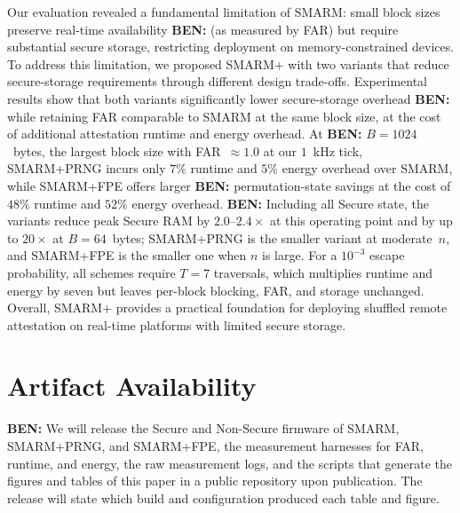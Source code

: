 \documentclass{ieeeaccess}
\DeclareRobustCommand{\ben}[1]{{\color{BENcolor}\textbf{BEN:} #1}}
\newcommand{\rtsmarm}{SMARM+\xspace}
\newcommand{\rtsmarmone}{SMARM+PRNG\xspace}
\newcommand{\rtsmarmtwo}{SMARM+FPE\xspace}
\begin{document}
Our evaluation revealed a fundamental limitation of SMARM: small block sizes preserve real-time availability \ben{(as measured by FAR)} but require substantial secure storage, restricting deployment on memory-constrained devices. To address 
this limitation, we proposed \rtsmarm with two variants that reduce secure-storage requirements through different design trade-offs. Experimental results show that both variants significantly lower secure-storage overhead \ben{while retaining FAR comparable to SMARM at the same block size}, at 
the cost of additional attestation runtime and energy overhead. At \ben{$B = 1024$~bytes, the largest block size with FAR~$\approx 1.0$ at our $1$~kHz tick}, \rtsmarmone incurs only $7\%$ runtime and $5\%$ energy overhead over SMARM, while \rtsmarmtwo offers larger \ben{permutation-state} savings at the cost of $48\%$ runtime and $52\%$ energy overhead.
\ben{Including all Secure state, the variants reduce peak Secure RAM by $2.0$--$2.4\times$ at this operating point and by up to $20\times$ at $B = 64$~bytes; \rtsmarmone is the smaller variant at moderate~$n$, and \rtsmarmtwo is the smaller one when $n$ is large.
For a $10^{-3}$ escape probability, all schemes require $T = 7$ traversals, which multiplies runtime and energy by seven but leaves per-block blocking, FAR, and storage unchanged.}
Overall, \rtsmarm provides a practical foundation for 
deploying shuffled remote attestation on real-time platforms with limited secure storage.

\section*{Artifact Availability}
\ben{We will release the Secure and Non-Secure firmware of SMARM, \rtsmarmone, and \rtsmarmtwo, the measurement harnesses for FAR, runtime, and energy, the raw measurement logs, and the scripts that generate the figures and tables of this paper in a public repository upon publication.
The release will state which build and configuration produced each table and figure.}




\end{document}
